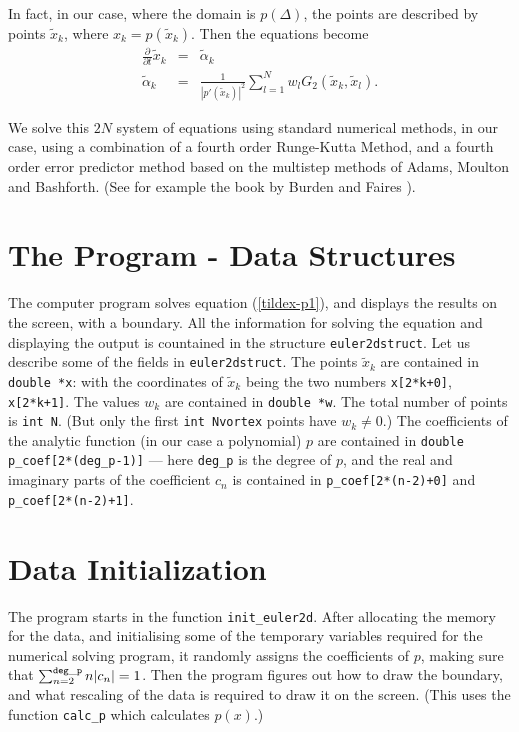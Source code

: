 \documentclass[12pt]{article}
\begin{document}
In fact, in our case, where the domain is $p(\Delta)$,
the points are described by points
$\tilde x_k$, where $x_k = p(\tilde x_k)$.  Then
the equations become
\begin{eqnarray}
\label{tildex-p1}
\frac{\partial}{\partial t} \tilde x_k &=& \tilde\alpha_k \\
\label{tildex-p2}
\tilde\alpha_k &=& \frac1{|p'(\tilde x_k)|^2}
     \sum_{l=1}^N w_l G_2(\tilde x_k,\tilde x_l) .
\end{eqnarray}

We solve this $2N$ system of equations using standard
numerical methods, in our case, using a combination
of a fourth order Runge-Kutta Method, and a fourth order
error predictor method based on the multistep methods of
Adams, Moulton and Bashforth.  (See for example the book
by Burden and Faires \cite{BF}).

\section{The Program - Data Structures}

The computer program solves equation (\ref{tildex-p1}), and displays
the results on the screen, with a boundary.  All the information
for solving the equation and displaying the output is countained
in the structure {\tt euler2dstruct}.  Let us describe some of
the fields in {\tt euler2dstruct}.  
The points $\tilde x_k$ are contained 
in {\tt double *x}: with the coordinates of
$\tilde x_k$ being the two numbers
{\tt x[2*k+0]}, {\tt x[2*k+1]}.  The values $w_k$ are contained
in {\tt double *w}.  The total number of points is
{\tt int N}.  (But only the first {\tt int Nvortex} points
have $w_k \ne 0$.)  The coefficients of the analytic function
(in our case a polynomial) $p$
are contained in {\tt double p\_coef[2*(deg\_p-1)]} --- here
{\tt deg\_p} is the degree of $p$, and the real and imaginary
parts of the coefficient
$c_n$ is contained in {\tt p\_coef[2*(n-2)+0]} and {\tt p\_coef[2*(n-2)+1]}.

\section{Data Initialization}

The program starts in the function {\tt init\_euler2d}.  After allocating
the memory for the data, and initialising some of the temporary variables
required for the numerical solving program, it randomly assigns the
coefficients of $p$, making sure that $\sum_{n=2}^{\tt deg\_p} n |c_n| = 1$.
Then the program figures out how to draw the boundary, and what rescaling
of the data is required to draw it on the screen.  (This uses the
function {\tt calc\_p} which calculates $p(x)$.)
\end{document}
